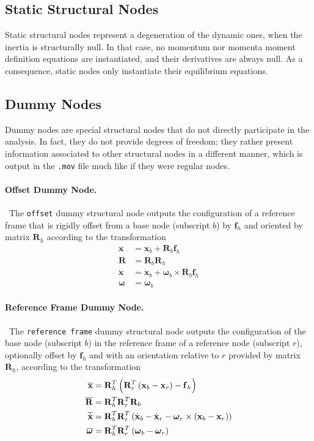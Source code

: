 \documentclass[10pt,dvips,fleqn,subeqn]{report}
\newcommand{\T}[1]{\bm{\mathbf{#1}}}
\begin{document}
\subsection{Static Structural Nodes}
\label{sec:nodes:structural nodes:static structural nodes}
Static structural nodes represent a degeneration of the dynamic ones,
when the inertia is structurally null.
In that case, no momentum nor momenta moment definition equations
are instantiated, and their derivatives are always null.
As a consequence, static nodes only instantiate their equilibrium equations.

\subsection{Dummy Nodes}
\label{sec:nodes:structural nodes:dummy nodes}
Dummy nodes are special structural nodes that do not directly 
participate in the analysis.
In fact, they do not provide degrees of freedom; they rather
present information associated to other structural nodes 
in a different manner, which is output in the \texttt{.mov}
file much like if they were regular nodes.



\paragraph{Offset Dummy Node.} \
The \texttt{offset} dummy structural node outputs the configuration
of a reference frame that is rigidly offset from a base node
(subscript $b$) by $\T{f}_h$ and oriented by matrix $\T{R}_h$ according 
to the transformation
\begin{align}
	\T{x} &= \T{x}_b + \T{R}_b \T{f}_h \\
	\T{R} &= \T{R}_b \T{R}_h \\
	\dot{\T{x}} &= \dot{\T{x}}_b + \T{\omega}_b \times \T{R}_b \T{f}_h \\
	\T{\omega} &= \T{\omega}_b
\end{align}


\paragraph{Reference Frame Dummy Node.} \
The \texttt{reference frame} dummy structural node
outputs the configuration of the base node (subscript $b$)
in the reference frame of a reference node (subscript $r$),
optionally offset by $\T{f}_h$ and with an orientation relative 
to $r$ provided by matrix $\T{R}_h$,
according to the transformation
\begin{align}
	\overline{\T{x}} &= \T{R}_h^T \plbr{\T{R}_r^T \plbr{\T{x}_b - \T{x}_r} - \T{f}_h}\\
	\overline{\T{R}} &= \T{R}_h^T \T{R}_r^T \T{R}_b \\
	\overline{\dot{\T{x}}} &= \T{R}_h^T \T{R}_r^T \plbr{
		\dot{\T{x}}_b
		- \dot{\T{x}}_r
		- \T{\omega}_r\times\plbr{\T{x}_b - \T{x}_r}
	} \\
	\overline{\T{\omega}} &= \T{R}_h^T \T{R}_r^T \plbr{\T{\omega}_b - \T{\omega}_r}
\end{align}
\end{document}
